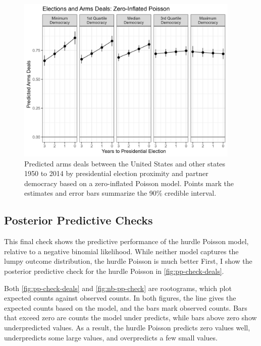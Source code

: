 \documentclass[12pt]{article}
\begin{document}
\begin{figure}[htpb]
	\centering
		\includegraphics[width=0.95\textwidth]{deals-pred-zip.png}
	\caption{{Predicted arms deals between the United States and other states 1950 to 2014 by presidential election proximity and partner democracy based on a zero-inflated Poisson model. Points mark the estimates and error bars summarize the 90\% credible interval.}}
	\label{fig:deals-pred-zip}
\end{figure}

\newpage

\subsection{Posterior Predictive Checks}


This final check shows the predictive performance of the hurdle Poisson model, relative to a negative binomial likelihood. 
While neither model captures the lumpy outcome distribution, the hurdle Poisson is much better 
First, I show the posterior predictive check for the hurdle Poisson in \autoref{fig:pp-check-deals}. 


Both \autoref{fig:pp-check-deals} and \autoref{fig:nb-pp-check} are rootograms, which plot expected counts against observed counts. 
In both figures, the line gives the expected counts based on the model, and the bars mark observed counts. 
Bars that exceed zero are counts the model under predicts, while bars above zero show underpredicted values. 
As a result, the hurdle Poisson predicts zero values well, underpredicts some large values, and overpredicts a few small values. 
\end{document}
